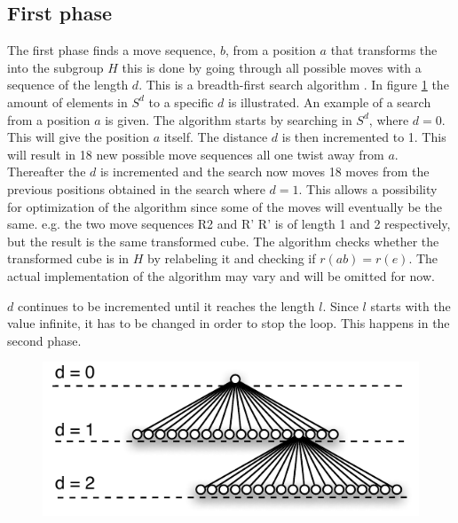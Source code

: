 \subsection{First phase}
\label{sub:firstPhase}
The first phase finds a move sequence, $b$, from a position $a$ that transforms the \rubik into the subgroup $H$ this is done by going through all possible moves with a sequence of the length $d$. This is a breadth-first search algorithm \cite[pp. 729-731]{Rosen07}.
In figure \ref{fig:searchExpansion} the amount of elements in $S^d$ to a specific $d$ is illustrated.
An example of a search from a position $a$ is given. The algorithm starts by searching in $S^{d}$, where $d =  0$. This will give the position $a$ itself. The distance $d$ is then incremented to 1. This will result in 18 new possible move sequences all one twist away from $a$. Thereafter the $d$ is incremented and the search now moves 18 moves from the previous positions obtained in the search where $d = 1$. This allows a possibility for optimization of the algorithm since some of the moves will eventually be the same. e.g. the two move sequences R2 and R' R' is of length 1 and 2 respectively, but the result is the same transformed cube. The algorithm checks whether the transformed cube is in $H$ by relabeling it and checking if $r(ab) = r(e)$. The actual implementation of the algorithm may vary and will be omitted for now.

$d$ continues to be incremented until it reaches the length $l$. Since $l$ starts with the value infinite, it has to be changed in order to stop the loop. This happens in the second phase.

\begin{figure}[!hb]
	\centering
		\includegraphics[scale=0.75]{input/pics/searchExpansion.pdf}
	\caption{}
	\label{fig:searchExpansion}
\end{figure}


